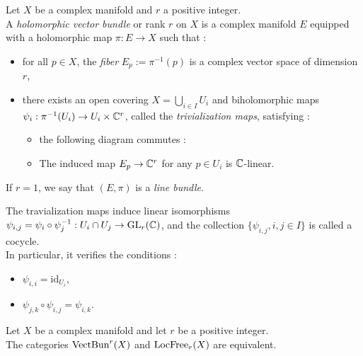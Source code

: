 \begin{mydef}
Let $X$ be a complex manifold and $r$ a positive integer.\\
A \textit{holomorphic vector bundle} or rank $r$ on $X$ is a complex manifold $E$ equipped with a holomorphic map $\pi : E \to X$ such that :
\begin{itemize}
\item[1.] for all $p \in X$, the \textit{fiber} $E_p := \pi^{-1}(p)$ is a complex vector space of dimension $r$,
\item[2.] there exists an open covering $X = \bigcup_{i\in I} U_i$ and biholomorphic maps $\psi_i : \pi^{-1}(U_i) \to U_i \times \mathbb{C}^r$, called the \textit{trivialization maps}, satisfying :
\begin{itemize}
\item[a.] the following diagram commutes :
\begin{center}


\end{center}
\item[b.] The induced map $E_p \to \mathbb{C}^r$ for any $p\in U_i$ is $\mathbb{C}$-linear.
\end{itemize}
\end{itemize}

\smallskip
If $r=1$, we say that $(E,\pi)$ is a \textit{line bundle}.
\end{mydef}

\begin{myrem}
The travialization maps induce linear isomorphisms $\psi_{i,j} = \psi_i \circ \psi_j^{-1} :U_i \cap U_j \to \text{GL}_r(\mathbb{C})$, and the collection $\{\psi_{i,j},i,j\in I\}$ is called a cocycle.\\
In particular, it verifies the conditions :
\begin{itemize}
\item[i.] $\psi_{i,i} = \text{id}_{U_i}$,
\item[ii.] $\psi_{j,k}\circ \psi_{i,j} = \psi_{i,k}$.
\end{itemize}
\end{myrem}


\begin{myprop}
Let $X$ be a complex manifold and let $r$ be a positive integer.\\
The categories $\text{VectBun}^r(X)$ and $\text{LocFree}_r(X)$ are equivalent.
\end{myprop}

